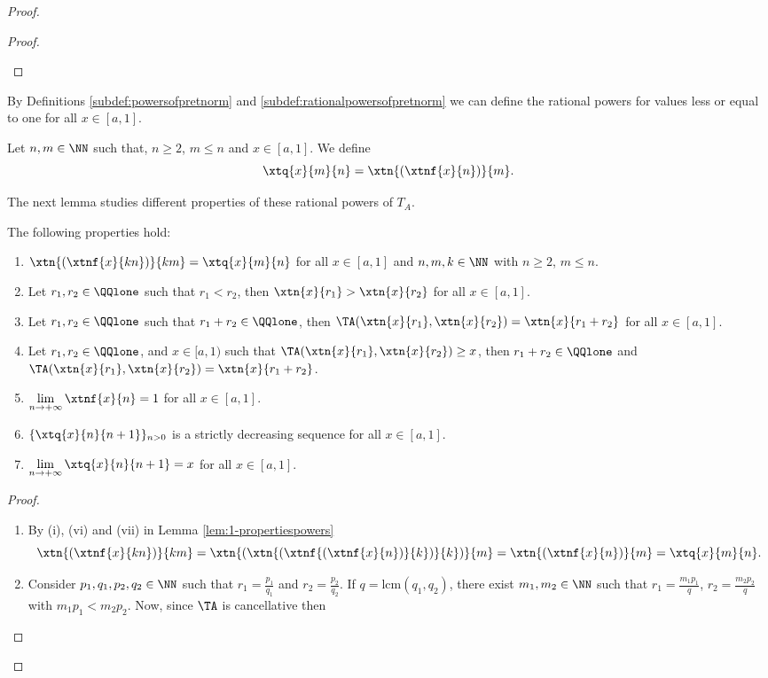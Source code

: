 \begin{proof}
\begin{proof}
\begin{enumerate}[label=(\roman*)]
		\end{enumerate}
	\end{proof}
	By Definitions \ref{subdef:powersofpretnorm} and \ref{subdef:rationalpowersofpretnorm} we can define the rational powers for values less or equal to one for all $x \in [a,1]$.
	\begin{subdefinition}\label{subdef:rationalpowersless1}
		Let $n,m \in \NN$ such that, $n \geq 2$, $m \leq n$ and $x \in [a,1]$. We define
		$$ \xtq{x}{m}{n} = \xtn{(\xtnf{x}{n})}{m}.$$
	\end{subdefinition}
	The next lemma studies different properties of these rational powers of $T_A$.
	\begin{sublemma} \label{lem:properties_rationalpowers}
		The following properties hold:
		\begin{enumerate}[label=(\roman*)]
			\item $\xtn{(\xtnf{x}{kn})}{km} = \xtq{x}{m}{n} $ for all $x \in [a,1]$ and $n,m,k \in \NN$ with $n\geq 2$, $m \leq n$.
			\item Let $r_1,r_2 \in \QQlone$ such that $r_1 < r_2$, then $\xtn{x}{r_1} > \xtn{x}{r_2}$ for all $x \in [a,1]$.
			\item Let $r_1, r_2 \in \QQlone$ such that $r_1 + r_2 \in \QQlone$, then $\TA(\xtn{x}{r_1},\xtn{x}{r_2}) = \xtn{x}{r_1+r_2}$ for all $x \in [a,1]$.
			\item Let $r_1,r_2 \in \QQlone$, and $x \in [a,1)$ such that $\TA(\xtn{x}{r_1},\xtn{x}{r_2}) \geq x$, then $r_1 + r_2 \in \QQlone$ and $\TA(\xtn{x}{r_1},\xtn{x}{r_2}) = \xtn{x}{r_1+r_2}$.
			\item $ \displaystyle \lim_{n \to +\infty} \xtnf{x}{n} =1$ for all $x \in [a,1]$.
			\item $\{\xtq{x}{n}{n+1 }\}_{n >0}$ is a strictly decreasing sequence for all $x \in [a,1]$.
			\item $\displaystyle \lim_{n \to +\infty} \xtq{x}{n}{n+1}=x$ for all $x \in [a,1]$.
		\end{enumerate}
	\end{sublemma}
	\begin{proof}
		\begin{enumerate}[label=(\roman*)]
			\item By (i), (vi) and (vii) in Lemma \ref{lem:1-propertiespowers}
			$$\xtn{(\xtnf{x}{kn})}{km} = \xtn{(\xtn{(\xtnf{(\xtnf{x}{n})}{k})}{k})}{m} = \xtn{(\xtnf{x}{n})}{m} = \xtq{x}{m}{n}.$$
			\item Consider $p_1,q_1,p_2,q_2 \in \NN$ such that $r_1=\frac{p_1}{q_1}$ and $r_2=\frac{p_2}{q_2}$. If $q=\text{lcm}(q_1,q_2)$, there exist $m_1,m_2 \in \NN$ such that $r_1 =\frac{m_1p_1}{q}$, $r_2 = \frac{m_2p_2}{q}$ with $m_1p_1 < m_2p_2$. Now, since $\TA$ is cancellative then

\end{enumerate}
\end{proof}
\end{proof}
